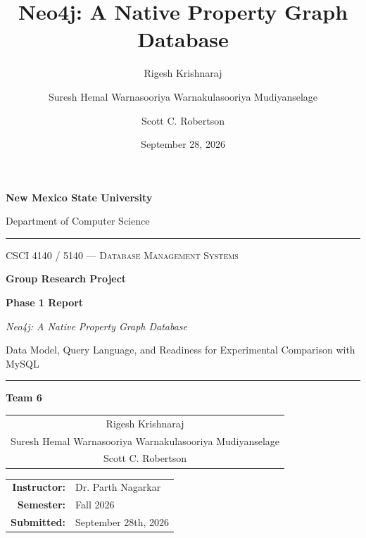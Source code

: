 \documentclass[11pt,a4paper]{article}
\title{\textbf{Neo4j: A Native Property Graph Database}}
\author{Rigesh Krishnaraj \and Suresh Hemal Warnasooriya Warnakulasooriya Mudiyanselage \and Scott C. Robertson}
\date{September 28, 2026}
\begin{document}
\begin{titlepage}
\centering

\vspace*{0.5cm}

{\LARGE\bfseries New Mexico State University \par}
\vspace{0.4cm}
{\large Department of Computer Science \par}

\vspace{1.2cm}

\rule{\textwidth}{0.4pt}
\vspace{0.6cm}

{\large\scshape CSCI 4140 / 5140 --- Database Management Systems \par}

\vspace{0.9cm}

{\Huge\bfseries Group Research Project \par}
\vspace{0.4cm}
{\LARGE\bfseries Phase 1 Report \par}

\vspace{0.7cm}

{\Large\itshape Neo4j: A Native Property Graph Database \par}
\vspace{0.3cm}
{\large Data Model, Query Language, and Readiness for Experimental Comparison with MySQL \par}

\vspace{0.6cm}
\rule{\textwidth}{0.4pt}

\vspace{1.4cm}

{\large\bfseries Team 6 \par}

\vspace{0.8cm}

{\large
\begin{tabular}{c}
Rigesh Krishnaraj \\[0.35cm]
Suresh Hemal Warnasooriya Warnakulasooriya Mudiyanselage \\[0.35cm]
Scott C. Robertson \\
\end{tabular}
\par}

\vfill

{\large
\begin{tabular}{rl}
\textbf{Instructor:} & Dr. Parth Nagarkar \\[0.25cm]
\textbf{Semester:}   & Fall 2026 \\[0.25cm]
\textbf{Submitted:}  & September 28th, 2026 \\
\end{tabular}
\par}


\end{titlepage}
\end{document}
